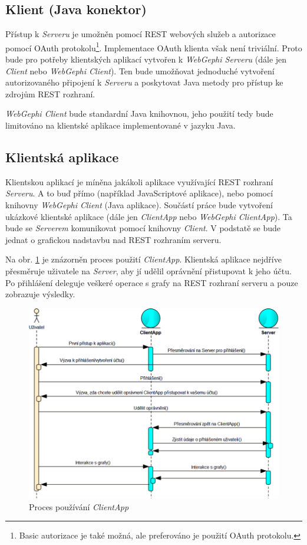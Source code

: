 \documentclass[thesis=M,czech]{FITthesis}[2014/05/6]
\begin{document}
\subsection{Klient (Java konektor)}
Přístup k \textit{Serveru} je umožněn pomocí REST webových služeb a autorizace pomocí OAuth protokolu\footnote{Basic autorizace je také možná, ale preferováno je použití OAuth protokolu.}.
Implementace OAuth klienta však není triviální. Proto bude pro potřeby klientských aplikací vytvořen  k \textit{WebGephi Serveru} (dále jen \textit{Client} nebo \textit{WebGephi Client}).
Ten bude umožňovat jednoduché vytvoření autorizovaného připojení k \textit{Serveru} a poskytovat Java metody pro přístup ke zdrojům REST rozhraní.

\textit{WebGephi Client} bude standardní Java knihovnou, jeho použití tedy bude limitováno na klientské aplikace implementované v jazyku Java.

\subsection{Klientská aplikace}
Klientskou aplikací je míněna jakákoli aplikace využívající REST rozhraní \textit{Serveru}. A to buď přímo (například JavaScriptové aplikace), nebo pomocí knihovny \textit{WebGephi Client} (Java aplikace).
Součástí práce bude vytvoření ukázkové klientské aplikace (dále jen \textit{ClientApp} nebo \textit{WebGephi ClientApp}). Ta bude se \textit{Serverem} komunikovat pomocí knihovny \textit{Client}.
V podstatě se bude jednat o grafickou nadstavbu nad REST rozhraním serveru.

Na obr. \ref{fig:clientApp-proces} je znázorněn proces použití \textit{ClientApp}. Klientská aplikace nejdříve přesměruje uživatele na \textit{Server}, aby jí udělil oprávnění přistupovat k jeho účtu.
Po přihlášení deleguje veškeré operace s grafy na REST rozhraní serveru a pouze zobrazuje výsledky.

\begin{figure}\centering
 	\includegraphics[width=1\textwidth]{images/diagram/clientApp-proces}
 	\caption[Proces používání \textit{ClientApp}]{Proces používání \textit{ClientApp}}\label{fig:clientApp-proces}
\end{figure}
\end{document}
